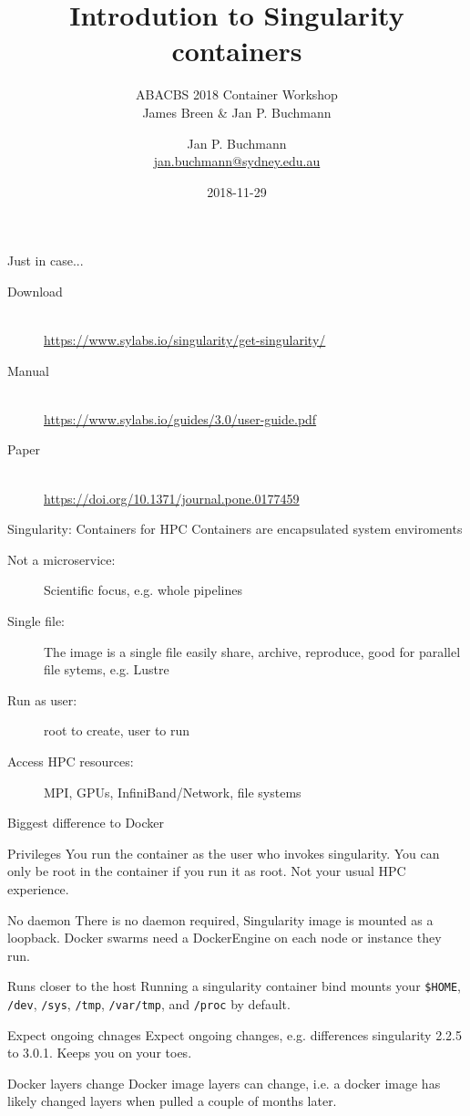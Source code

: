 \documentclass{beamer}
\title[]{Introdution to Singularity containers}
\subtitle{ABACBS 2018 Container Workshop\\James Breen \& Jan P. Buchmann}
\author[]{Jan P. Buchmann\\\small{\href{mailto:jan.buchmann@sydney.edu.au}{jan.buchmann@sydney.edu.au}}}
\institute{The University Of Sydney}
\date{2018-11-29}
\newcommand{\tty}[1]{\texttt{#1}\xspace}
\begin{document}
  \titlepage

  \begin{frame}{Just in case...}
    \footnotesize
    \begin{description}
      \item[Download] \leavevmode\\ \url{https://www.sylabs.io/singularity/get-singularity/}
      \item[Manual] \leavevmode\\ \url{https://www.sylabs.io/guides/3.0/user-guide.pdf}
      \item[Paper] \leavevmode\\ \url{https://doi.org/10.1371/journal.pone.0177459}
    \end{description}
  \end{frame}

  \begin{frame}{Singularity: Containers for HPC}
   Containers are encapsulated system enviroments
    \begin{description}
      \item[Not a microservice:] Scientific focus, e.g. whole pipelines
      \item[Single file:] The image is a single file easily share, archive,
                          reproduce, good for parallel file sytems, e.g. Lustre
      \item[Run as user:] root to create, user to run
      \item[Access HPC resources:] MPI, GPUs, InfiniBand/Network, file systems
    \end{description}
  \end{frame}

  \begin{frame}{Biggest difference to Docker}
    \small
    \begin{block}{Privileges}
      You run the container as the user who invokes singularity. You can only
      be root in the container if you run it as root. Not your usual HPC
      experience.
    \end{block}
    \begin{block}{No daemon}
      There is no daemon required, Singularity image is mounted as a loopback.
      Docker swarms need a DockerEngine on each  node or instance they run.
    \end{block}
    \begin{block}{Runs closer to the host}
      Running a singularity container bind mounts your \tty{\$HOME}, \tty{/dev},
      \tty{/sys}, \tty{/tmp}, \tty{/var/tmp}, and \tty{/proc} by default.
    \end{block}
    \begin{block}{Expect ongoing chnages}
      Expect ongoing changes, e.g. differences singularity 2.2.5 to 3.0.1.
      Keeps you on your toes.
    \end{block}
    \begin{block}{Docker layers change}
      Docker image layers can change, i.e. a docker image has likely changed
      layers when pulled a couple of months later.
    \end{block}
  \end{frame}
\end{document}

